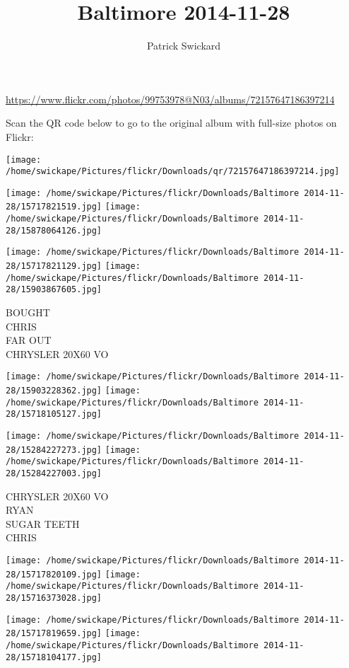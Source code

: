 \documentclass[10pt,letterpaper]{article}
\title{Baltimore 2014-11-28}
\author{Patrick Swickard}
\date{}
\begin{document}
\maketitle

\url{https://www.flickr.com/photos/99753978@N03/albums/72157647186397214}

Scan the QR code below to go to the original album with full-size photos on Flickr:

\texttt{[image: /home/swickape/Pictures/flickr/Downloads/qr/72157647186397214.jpg]}
\pagebreak

\texttt{[image: /home/swickape/Pictures/flickr/Downloads/Baltimore 2014-11-28/15717821519.jpg]}
\texttt{[image: /home/swickape/Pictures/flickr/Downloads/Baltimore 2014-11-28/15878064126.jpg]}

\texttt{[image: /home/swickape/Pictures/flickr/Downloads/Baltimore 2014-11-28/15717821129.jpg]}
\texttt{[image: /home/swickape/Pictures/flickr/Downloads/Baltimore 2014-11-28/15903867605.jpg]}

BOUGHT\\
CHRIS\\
FAR OUT\\
CHRYSLER 20X60 VO
\pagebreak

\texttt{[image: /home/swickape/Pictures/flickr/Downloads/Baltimore 2014-11-28/15903228362.jpg]}
\texttt{[image: /home/swickape/Pictures/flickr/Downloads/Baltimore 2014-11-28/15718105127.jpg]}

\texttt{[image: /home/swickape/Pictures/flickr/Downloads/Baltimore 2014-11-28/15284227273.jpg]}
\texttt{[image: /home/swickape/Pictures/flickr/Downloads/Baltimore 2014-11-28/15284227003.jpg]}

CHRYSLER 20X60 VO\\
RYAN\\
SUGAR TEETH\\
CHRIS
\pagebreak

\texttt{[image: /home/swickape/Pictures/flickr/Downloads/Baltimore 2014-11-28/15717820109.jpg]}
\texttt{[image: /home/swickape/Pictures/flickr/Downloads/Baltimore 2014-11-28/15716373028.jpg]}

\texttt{[image: /home/swickape/Pictures/flickr/Downloads/Baltimore 2014-11-28/15717819659.jpg]}
\texttt{[image: /home/swickape/Pictures/flickr/Downloads/Baltimore 2014-11-28/15718104177.jpg]}
\end{document}
